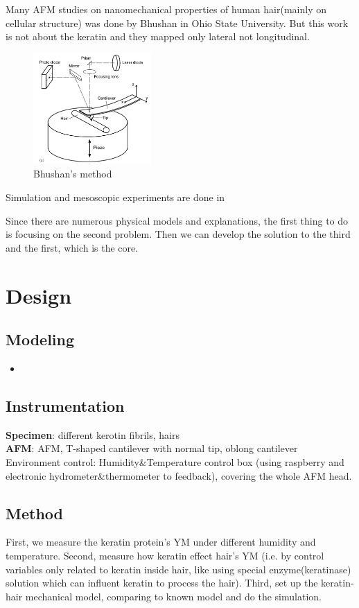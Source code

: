 \documentclass{article}
\begin{document}
Many AFM studies on nanomechanical properties of human hair(mainly on cellular structure) was done by Bhushan in Ohio State University\citep{bhushan2006afm}. But this work is not about the keratin and they mapped only lateral not longitudinal. 
\begin{figure}[H]
    \centering
    \includegraphics[width=0.4\textwidth]{bhushan.png}
    \caption{Bhushan's method}
\end{figure}

Simulation and mesoscopic experiments are done in \citep{}

Since there are numerous physical models and explanations, the first thing to do is focusing on the second problem. Then we can develop the solution to the third and the first, which is the core.


\section{Design}
\subsection{Modeling}
\begin{itemize}
    \item 
\end{itemize}

\subsection{Instrumentation}
\textbf{Specimen}: different kerotin fibrils, hairs\\ 
\textbf{AFM}: AFM, T-shaped cantilever with normal tip, oblong cantilever\\
Environment control: Humidity\&Temperature control box (using raspberry and electronic hydrometer\&thermometer to feedback), covering the whole AFM head.

\subsection{Method}
First, we measure the keratin protein's YM under different humidity and temperature. Second, measure how keratin effect hair's YM (i.e. by control variables only related to keratin inside hair, like using special enzyme(keratinase\citep{lin1992purification}) solution which can influent keratin to process the hair).  Third, set up the keratin-hair mechanical model, comparing to known model and do the simulation.
\end{document}
